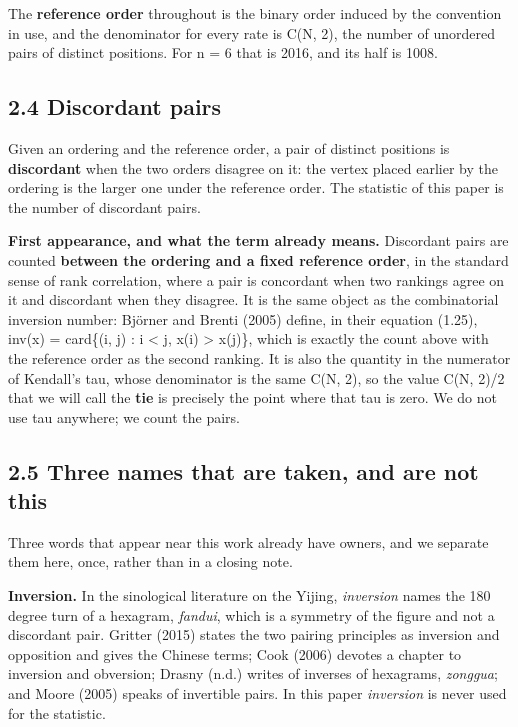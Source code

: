 \documentclass[11pt,a4paper]{article}
\begin{document}
The \textbf{reference order} throughout is the binary order induced by the convention in use, and the denominator for every rate is C(N, 2), the number of unordered pairs of distinct positions. For n = 6 that is 2016, and its half is 1008.

\subsection*{2.4 Discordant pairs}

Given an ordering and the reference order, a pair of distinct positions is \textbf{discordant} when the two orders disagree on it: the vertex placed earlier by the ordering is the larger one under the reference order. The statistic of this paper is the number of discordant pairs.

\textbf{First appearance, and what the term already means.} Discordant pairs are counted \textbf{between the ordering and a fixed reference order}, in the standard sense of rank correlation, where a pair is concordant when two rankings agree on it and discordant when they disagree. It is the same object as the combinatorial inversion number: Björner and Brenti (2005) define, in their equation (1.25), inv(x) = card\{(i, j) : i < j, x(i) > x(j)\}, which is exactly the count above with the reference order as the second ranking. It is also the quantity in the numerator of Kendall's tau, whose denominator is the same C(N, 2), so the value C(N, 2)/2 that we will call the \textbf{tie} is precisely the point where that tau is zero. We do not use tau anywhere; we count the pairs.

\subsection*{2.5 Three names that are taken, and are not this}

Three words that appear near this work already have owners, and we separate them here, once, rather than in a closing note.

\textbf{Inversion.} In the sinological literature on the Yijing, \emph{inversion} names the 180 degree turn of a hexagram, \emph{fandui}, which is a symmetry of the figure and not a discordant pair. Gritter (2015) states the two pairing principles as inversion and opposition and gives the Chinese terms; Cook (2006) devotes a chapter to inversion and obversion; Drasny (n.d.) writes of inverses of hexagrams, \emph{zonggua}; and Moore (2005) speaks of invertible pairs. In this paper \emph{inversion} is never used for the statistic.
\end{document}
